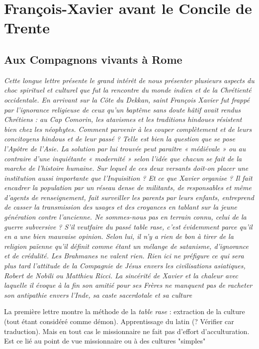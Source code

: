 \chapter{François-Xavier avant le Concile de Trente}

\section{Aux Compagnons vivants à Rome}

\textit{Cette longue lettre présente le grand intérêt de nous présenter
plusieurs aspects du choc spirituel et culturel que fut la rencontre
du monde indien et de la Chrétienté occidentale. En arrivant sur
la Côte du Dekkan, saint François Xavier fut frappé par l'ignorance
religieuse de ceux qu'un baptême sans doute hâtif avait rendus
Chrétiens : au Cap Comorin, les atavismes et les traditions hindoues résistent bien chez les néophytes. Comment parvenir à les
couper complètement et de leurs concitoyens hindous et de leur
passé ? Telle est bien la question que se pose l'Apôtre de l'Asie.
La solution par lui trouvée peut paraître « médiévale » ou au
contraire d'une inquiétante « modernité » selon l'idée que chacun
se fait de la marche de l'histoire humaine. Sur lequel de ces deux
versants doit-on placer une institution aussi importante que l'Inquisition
? Et ce que Xavier organise ? Il fait encadrer la population
par un réseau dense de militants, de responsables et même d'agents
de renseignement, fait surveiller les parents par leurs enfants, entreprend
de casser la transmission des usages et des croyances en
tablant sur la jeune génération contre l'ancienne. Ne sommes-nous
pas en terrain connu, celui de la guerre subversive ? S'il veutfaire
du passé table rase, c'est évidemment parce qu'il en a une bien
mauvaise opinion. Selon lui, il n'y a rien de bon à tirer de la religion
païenne qu'il définit comme étant un mélange de satanisme,
d'ignorance et de crédulité. Les Brahmanes ne valent rien. Rien ici
ne préfigure ce qui sera plus tard l'attitude de la Compagnie de
Jésus envers les civilisations asiatiques, Robert de Nobili ou Matthieu
Ricci. La sincérité de Xavier et la chaleur avec laquelle il évoque
à la fin son amitié pour ses Frères ne manquent pas de racheter
son antipathie envers l'Inde, sa caste sacerdotale et sa culture}


\begin{Synthesis}
La première lettre montre la méthode de la \textit{table rase} : extraction de la culture (tout étant considéré comme démon). Apprentissage du latin (? Vérifier car traduction). Mais en tout cas le missionnaire ne fait pas d'effort d'acculturation.
Est ce lié au point de vue missionnaire ou à des cultures "simples"
\end{Synthesis}

